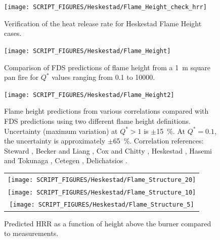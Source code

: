 \begin{figure}[!h]
\begin{center}
\texttt{[image: SCRIPT\_FIGURES/Heskestad/Flame\_Height\_check\_hrr]}
\end{center}
\caption[Verification of the heat release rate for Heskestad Flame Height cases]
{Verification of the heat release rate for Heskestad Flame Height cases.}
\label{Flame_Height_check_hrr}
\end{figure}

\clearpage

\begin{figure}[!h]
\begin{center}
\texttt{[image: SCRIPT\_FIGURES/Heskestad/Flame\_Height]}
\end{center}
\caption[Summary of flame height predictions, Heskestad correlation]
{Comparison of FDS predictions of flame height from a 1~m square pan fire for $Q^*$ values ranging from
0.1 to 10000.}
\label{Flame_Height}
\end{figure}

\begin{figure}[!h]
\texttt{[image: SCRIPT\_FIGURES/Heskestad/Flame\_Height2]}
\caption[Flame height uncertainty, multiple correlations and flame height definitions]
{Flame height predictions from various correlations compared with FDS predictions using two different flame height definitions.  Uncertainty (maximum variation) at $Q^*>1$ is $\pm$15~\%.  At $Q^*=0.1$, the uncertainty is approximately $\pm$65~\%. Correlation references: Steward \cite{Steward:1970}, Becker and Liang \cite{Becker:1978}, Cox and Chitty \cite{Cox:1985}, Heskestad \cite{SFPE:Heskestad}, Hasemi and Tokunaga \cite{Hasemi:1984}, Cetegen \cite{Cetegen:1984}, Delichatsios \cite{Delichatsios:1984}.}
\label{Flame_Height2}
\end{figure}


\begin{figure}[p]
\begin{center}
\begin{tabular}{c}
\texttt{[image: SCRIPT\_FIGURES/Heskestad/Flame\_Structure\_20]} \\
\texttt{[image: SCRIPT\_FIGURES/Heskestad/Flame\_Structure\_10]} \\
\texttt{[image: SCRIPT\_FIGURES/Heskestad/Flame\_Structure\_5]}
\end{tabular}
\end{center}
\caption[Predicted HRR as a function of height above the burner]{Predicted HRR as a function of height above the burner compared to measurements.}
\label{Flame_Structure}
\end{figure}



